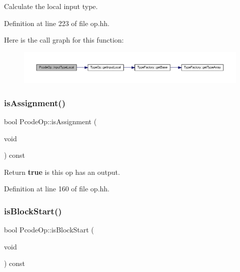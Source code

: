 Calculate the local input type. 



Definition at line 223 of file op.\+hh.

Here is the call graph for this function\+:
\nopagebreak
\begin{figure}[H]
\begin{center}
\leavevmode
\includegraphics[width=350pt]{class_pcode_op_a6e269b80886b90fc24b39f331e909c84_cgraph}
\end{center}
\end{figure}
\mbox{\label{class_pcode_op_ab4b60782c2177bffc1f07d96ea2feef8}} 
\subsubsection{\texorpdfstring{isAssignment()}{isAssignment()}}
{\footnotesize\ttfamily bool Pcode\+Op\+::is\+Assignment (\begin{DoxyParamCaption}\item[{void}]{ }\end{DoxyParamCaption}) const\hspace{0.3cm}{\ttfamily [inline]}}



Return {\bfseries{true}} is this op has an output. 



Definition at line 160 of file op.\+hh.

\mbox{\label{class_pcode_op_af45c57119fdb3b96af3638cfbe89eddc}} 
\subsubsection{\texorpdfstring{isBlockStart()}{isBlockStart()}}
{\footnotesize\ttfamily bool Pcode\+Op\+::is\+Block\+Start (\begin{DoxyParamCaption}\item[{void}]{ }\end{DoxyParamCaption}) const\hspace{0.3cm}{\ttfamily [inline]}}



